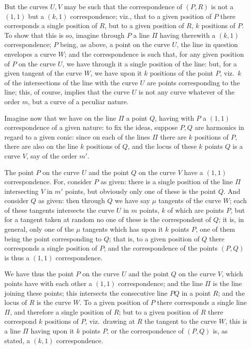 \documentclass[11pt,a4paper]{article}
\begin{document}
\medskip

But the curves $U, V$ may be such that the correspondence of $(P, R)$ is not a $(1, 1)$ but a $(k, 1)$ correspondence; viz., that to a given position of $P$ there corresponds a single position of $R$, but to a given position of $R$, $k$ positions of $P$. To show that this is so, imagine through $P$ a line $\Pi$ having therewith a $(k, 1)$ correspondence; $P$ being, as above, a point on the curve $U$, the line in question envelopes a curve $W$; and the correspondence is such that, for any given position of $P$ on the curve $U$, we have through it a single position of the line: but, for a given tangent of the curve $W$, we have upon it $k$ positions of the point $P$, viz.\ $k$ of the intersections of the line with the curve $U$ are points corresponding to the line; this, of course, implies that the curve $U$ is not any curve whatever of the order $m$, but a curve of a peculiar nature.

\newpage


\noindent Imagine now that we have on the line $\Pi$ a point $Q$, having with $P$ a $(1, 1)$ correspondence of a given nature: to fix the ideas, suppose $P, Q$ are harmonics in regard to a given conic: since on each of the lines $\Pi$ there are $k$ positions of $P$, there are also on the line $k$ positions of $Q$, and the locus of these $k$ points $Q$ is a curve $V$, say of the order $m'$.

\medskip

The point $P$ on the curve $U$ and the point $Q$ on the curve $V$ have a $(1, 1)$ correspondence. For, consider $P$ as given: there is a single position of the line $\Pi$ intersecting $V$ in $m'$ points, but obviously only one of these is the point $Q$. And consider $Q$ as given: then through $Q$ we have say $\mu$ tangents of the curve $W$; each of these tangents intersects the curve $U$ in $m$ points, $k$ of which are points $P$, but for a tangent taken at random no one of these is the correspondent of $Q$; it is, in general, only one of the $\mu$ tangents which has upon it $k$ points $P$, one of them being the point corresponding to $Q$; that is, to a given position of $Q$ there corresponds a single position of $P$; and the correspondence of the points $(P, Q)$ is thus a $(1, 1)$ correspondence.

\medskip

We have thus the point $P$ on the curve $U$ and the point $Q$ on the curve $V$, which points have with each other a $(1, 1)$ correspondence; and the line $\Pi$ is the line joining these points; this intersects the consecutive line $PQ$ in a point $R$; and the locus of $R$ is the curve $W$. To a given position of $P$ there corresponds a single line $\Pi$, and therefore a single position of $R$; but to a given position of $R$ there correspond $k$ positions of $P$, viz.\ drawing at $R$ the tangent to the curve $W$, this is a line $\Pi$ having upon it $k$ points $P$, or the correspondence of $(P, Q)$ is, as stated, a $(k, 1)$ correspondence.
\end{document}
